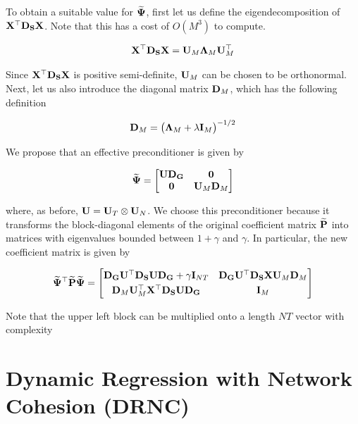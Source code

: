 To obtain a suitable value for $\widetilde{\mathbf{\Psi}}$, first let us define the eigendecomposition of $\mathbf{X}^\top\mathbf{D}_{\mathbf{S}} \mathbf{X}$. Note that this has a cost of $O(M^3)$ to compute. 

\begin{equation}
    \mathbf{X}^\top\mathbf{D}_{\mathbf{S}} \mathbf{X} = \mathbf{U}_M \mathbf{\Lambda}_M \mathbf{U}_M^\top
\end{equation}

Since $\mathbf{X}^\top\mathbf{D}_{\mathbf{S}} \mathbf{X}$ is positive semi-definite, $\mathbf{U}_M$ can be chosen to be orthonormal. Next, let us also introduce the diagonal matrix $\mathbf{D}_M$, which has the following definition 

\begin{equation}
    \mathbf{D}_M = \big(\mathbf{\Lambda}_M + \lambda \mathbf{I}_M \big)^{-1/2}
\end{equation}

We propose that an effective preconditioner is given by 

\begin{equation}
    \widetilde{\mathbf{\Psi}} =  \begin{bmatrix}
        \mathbf{U} \mathbf{D}_{\mathbf{G}} & \mathbf{0} \\
        \mathbf{0} & \mathbf{U}_M \mathbf{D}_M 
    \end{bmatrix}
\end{equation}


where, as before, $\mathbf{U} = \mathbf{U}_T \otimes \mathbf{U}_N $. We choose this preconditioner because it transforms the block-diagonal elements of the original coefficient matrix $\widetilde{\mathbf{P}}$ into matrices with eigenvalues bounded between $1 + \gamma$ and $\gamma$. In particular, the new coefficient matrix is given by

\begin{equation*}
    \widetilde{\mathbf{\Psi}}^\top \widetilde{\mathbf{P}}  \widetilde{\mathbf{\Psi}} = 
       \begin{bmatrix}
        \mathbf{D}_{\mathbf{G}} \mathbf{U}^\top \mathbf{D}_{\mathbf{S}} \mathbf{U} \mathbf{D}_{\mathbf{G}} + \gamma \mathbf{I}_{NT}  &  \mathbf{D}_{\mathbf{G}} \mathbf{U}^\top \mathbf{D}_{\mathbf{S}} \mathbf{X} \mathbf{U}_M \mathbf{D}_M \\[0.1cm] 
        \mathbf{D}_M \mathbf{U}_M^\top \mathbf{X}^\top \mathbf{D}_{\mathbf{S}} \mathbf{U} \mathbf{D}_{\mathbf{G}} & \mathbf{I}_M
        \end{bmatrix}
\end{equation*}

Note that the upper left block can be multiplied onto a length $NT$ vector with complexity 




\section{Dynamic Regression with Network Cohesion (DRNC)}
